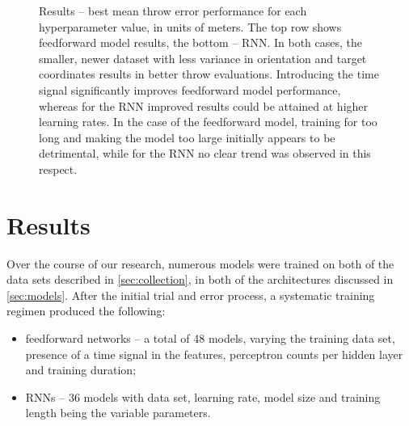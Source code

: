 \documentclass{article}
\begin{document}
\begin{figure}[!hbt]
	\centering
	\caption{Results -- best mean throw error performance for each hyperparameter value, in units of meters. The top row shows feedforward model results, the bottom -- RNN. In both cases, the smaller, newer dataset with less variance in orientation and target coordinates results in better throw evaluations.  Introducing the time signal significantly improves feedforward model performance, whereas for the RNN improved results could be attained at higher learning rates. In the case of the feedforward model, training for too long and making the model too large initially appears to be detrimental, while for the RNN no clear trend was observed in this respect.}
	\label{fig:rnn_naive_best}
\end{figure}

\section{Results}
\label{sec:results}

Over the course of our research, numerous models were trained on both of the data sets described in \ref{sec:collection}, in both of the architectures discussed in \ref{sec:models}. After the initial trial and error process, a systematic training regimen produced the following:

\begin{itemize}
	\item feedforward networks -- a total of 48 models, varying the training data set, presence of a time signal in the features, perceptron counts per hidden layer and training duration;
	\item RNNs -- 36 models with data set, learning rate, model size and training length being the variable parameters.
\end{itemize}
\end{document}
